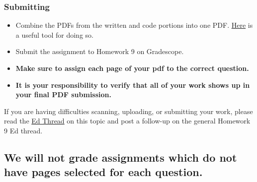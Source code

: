 \documentclass[11pt]{article}
\providecommand{\tightlist}{%
      \setlength{\itemsep}{0pt}\setlength{\parskip}{0pt}}
\begin{document}
\subsubsection{Submitting}\label{submitting}

\begin{itemize}
\tightlist
\item
  Combine the PDFs from the written and code portions into one PDF.
  \href{https://smallpdf.com/merge-pdf}{Here} is a useful tool for doing
  so.
\item
  Submit the assignment to Homework 9 on Gradescope.
\item
  \textbf{Make sure to assign each page of your pdf to the correct
  question.}
\item
  \textbf{It is your responsibility to verify that all of your work
  shows up in your final PDF submission.}
\end{itemize}

If you are having difficulties scanning, uploading, or submitting your
work, please read the
\href{https://edstem.org/us/courses/94054/discussion/7533569}{Ed Thread}
on this topic and post a follow-up on the general Homework 9 Ed thread.

\subsection{\texorpdfstring{\textbf{We will not grade assignments which
do not have pages selected for each
question.}}{We will not grade assignments which do not have pages selected for each question.}}\label{we-will-not-grade-assignments-which-do-not-have-pages-selected-for-each-question.}


    
    
    
\end{document}
